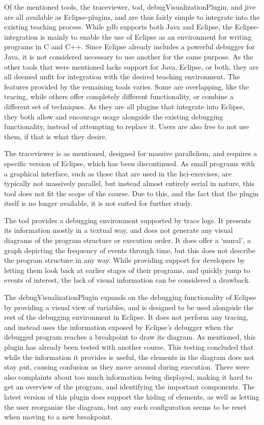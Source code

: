 Of the mentioned tools, the \gls{traceviewer}, \gls{tod}, \gls{debugVisualizationPlugin}, and \gls{jive} are all available as Eclipse-plugins, and are thus fairly simple to integrate into the existing teaching process.
While \gls{gdb} supports both Java and Eclipse, the Eclipse-integration is mainly to enable the use of Eclipse as an environment for writing programs in C and C++.
Since Eclipse already includes a powerful debugger for Java, it is not considered necessary to use another for the same purpose.
As the other tools that were mentioned lacks support for Java, Eclipse, or both, they are all deemed unfit for integration with the desired teaching environment.
The features provided by the remaining tools varies.
Some are overlapping, like the tracing, while others offer completely different functionality, or combine a different set of techniques.
As they are all plugins that integrate into Eclipse, they both allow and encourage usage alongside the existing debugging functionality, instead of attempting to replace it.
Users are also free to not use them, if that is what they desire.

The \gls{traceviewer} is as mentioned, designed for massive parallelism, and requires a specific version of Eclipse, which has been discontinued.
As small programs with a graphical interface, such as those that are used in the \gls{hci}-exercises, are typically not massively parallel, but instead almost entirely serial in nature, this tool does not fit the scope of the course.
Due to this, and the fact that the plugin itself is no longer available, it is not suited for further study.

The \gls{tod} provides a debugging environment supported by trace logs.
It presents its information mostly in a textual way, and does not generate any visual diagrams of the program structure or execution order.
It does offer a `mural', a graph depicting the frequency of events through time, but this does not describe the program structure in any way.
While providing support for developers by letting them look back at earlier stages of their programs, and quickly jump to events of interest, the lack of visual information can be considered a drawback.

The \gls{debugVisualizationPlugin} expands on the debugging functionality of Eclipse by providing a visual view of variables, and is designed to be used alongside the rest of the debugging environment in Eclipse.
It does not perform any tracing, and instead uses the information exposed by Eclipse's debugger when the debugged program reaches a breakpoint to draw its diagram.
As mentioned, this plugin has already been tested with another course.
This testing concluded that while the information it provides is useful, the elements in the diagram does not stay put, causing confusion as they move around during execution.
There were also complaints about too much information being displayed, making it hard to get an overview of the program, and identifying the important components.
The latest version of this plugin does support the hiding of elements, as well as letting the user reorganize the diagram, but any such configuration seems to be reset when moving to a new breakpoint.

